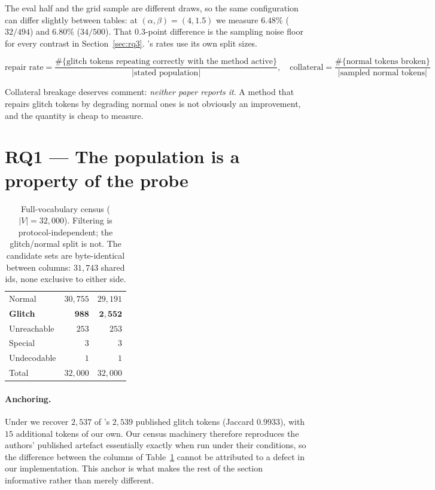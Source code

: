 \noindent The eval half and the grid sample are different draws, so the same
configuration can differ slightly between tables: at $(\alpha,\beta) = (4, 1.5)$
we measure $6.48\%$ ($32/494$) and $6.80\%$ ($34/500$). That $0.3$-point
difference is the sampling noise floor for every contrast in
Section~\ref{sec:rq3}. \gc{}'s rates use its own split sizes.

\[
\text{repair rate} = \frac{\#\{\text{glitch tokens repeating correctly with the method active}\}}{|\text{stated population}|},\quad
\text{collateral} = \frac{\#\{\text{normal tokens broken}\}}{|\text{sampled normal tokens}|}
\]

Collateral breakage deserves comment: \emph{neither paper reports it}. A method
that repairs glitch tokens by degrading normal ones is not obviously an
improvement, and the quantity is cheap to measure.

\section{RQ1 --- The population is a property of the probe}
\label{sec:rq1}

\begin{table}[h]
\centering
\caption{Full-vocabulary census ($|V| = 32{,}000$). Filtering is
protocol-independent; the glitch/normal split is not. The candidate sets are
byte-identical between columns: $31{,}743$ shared ids, none exclusive to either
side.}
\label{tab:census}
\begin{tabular}{lrr}
\toprule
& \Ppaper{} & \Pcode{} \\
\midrule
Normal            & $30{,}755$ & $29{,}191$ \\
\textbf{Glitch}   & $\mathbf{988}$ & $\mathbf{2{,}552}$ \\
Unreachable       & $253$ & $253$ \\
Special           & $3$ & $3$ \\
Undecodable       & $1$ & $1$ \\
\midrule
Total             & $32{,}000$ & $32{,}000$ \\
\bottomrule
\end{tabular}
\end{table}

\paragraph{Anchoring.} Under \Pcode{} we recover $2{,}537$ of \gc{}'s $2{,}539$
published glitch tokens (Jaccard $0.9933$), with $15$ additional tokens of our
own. Our census machinery therefore reproduces the authors' published artefact
essentially exactly when run under their conditions, so the difference between
the columns of Table~\ref{tab:census} cannot be attributed to a defect in our
implementation. This anchor is what makes the rest of the section informative
rather than merely different.


